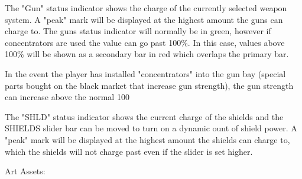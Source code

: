 The "Gun" status indicator shows the charge of the currently selected
weapon system.  A "peak" mark will be displayed at the highest amount
the guns can charge to.  The guns status indicator will normally be in
green, however if concentrators are used the value can go past 100\%.
In this case, values above 100\% will be shown as a secondary bar in
red which overlaps the primary bar.

In the event the player has installed "concentrators" into the gun bay (special parts bought on the black market that increase gun strength), the gun strength can increase above the normal 100%

The "SHLD" status indicator shows the current charge of the shields and
the SHIELDS slider bar can be moved to turn on a dynamic ount of
shield power.  A "peak" mark will be displayed at the highest amount
the shields can charge to, which the shields will not charge past
even if the slider is set higher.

Art Assets:

